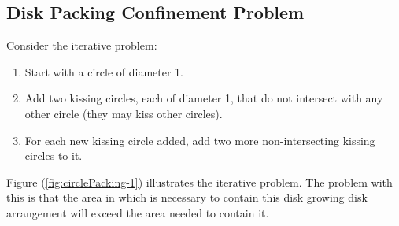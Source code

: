 \subsection{Disk Packing Confinement Problem}
Consider the iterative problem:
\begin{enumerate}%
\item Start with a circle of diameter 1.
\item Add two kissing circles, each of diameter 1, that do not intersect with any other circle (they may kiss other
circles).
\item For each new kissing circle added, add two more non-intersecting kissing circles to it.
\end{enumerate} 
Figure (\ref{fig:circlePacking-1}) illustrates the iterative problem.  The problem with this is that the area in
which is necessary to contain this disk growing disk arrangement will exceed the area needed to contain it.
